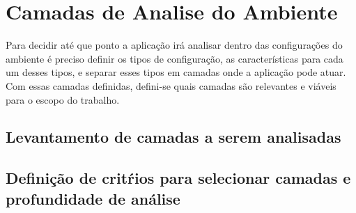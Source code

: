 \section{Camadas de Analise do Ambiente}
Para decidir até que ponto a aplicação irá analisar dentro das configurações do ambiente é preciso definir os tipos de configuração, as características para cada um desses tipos, e separar esses tipos em camadas onde a aplicação pode atuar. Com essas camadas definidas, defini-se quais camadas são relevantes e viáveis para o escopo do trabalho.

\subsection{Levantamento de camadas a serem analisadas}

\subsection{Definição de critŕios para selecionar camadas e profundidade de análise}

